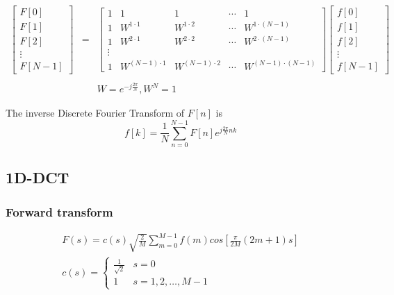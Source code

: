 \documentclass[journal,comsoc]{IEEEtran}
\begin{document}
\begin{figure*}[!ht]
\normalsize

\begin{eqnarray}
  \label{dft-mat}
  \begin{bmatrix}
    F[0]\\F[1]\\F[2]\\\vdots\\F[N-1]
  \end{bmatrix}&=&
  \begin{bmatrix}
    1&1&1&\cdots&1\\
    1&W^{1\cdot1}&W^{1\cdot2}&\cdots&W^{1\cdot(N-1)}\\
    1&W^{2\cdot1}&W^{2\cdot2}&\cdots&W^{2\cdot(N-1)}\\
    \vdots&\\
    1&W^{(N-1)\cdot1}&W^{(N-1)\cdot2}&\cdots&W^{(N-1)\cdot(N-1)}
  \end{bmatrix}
  \begin{bmatrix}
    f[0]\\f[1]\\f[2]\\\vdots\\f[N-1]
  \end{bmatrix}\\\nonumber\\
  &&W=e^{-j\frac{2\pi}{N}},W^{N}=1\nonumber
\end{eqnarray}

\hrulefill
\end{figure*}



The inverse Discrete Fourier Transform of $F[n]$ is
\begin{equation}
  \label{idft-equ}
  f[k]=\frac{1}{N}\sum_{n=0}^{N-1}F[n]e^{j\frac{2\pi}{N}nk}
\end{equation}

\subsection{1D-DCT}
\label{subsec:subsec-1d-dct}

\subsubsection{Forward transform}
\label{subsubsec:1d-dct-forward-transform}

\begin{eqnarray}
  \label{equ:1d-dct}
  F(s)=c(s)\sqrt{\frac{2}{M}}\sum_{m=0}^{M-1}f(m)cos[\frac{\pi}{2M}(2m+1)s]\\
  c(s)=
  \begin{cases}
    \frac{1}{\sqrt{2}}&s=0\\
    1&s=1,2,\ldots,M-1
  \end{cases}\nonumber
\end{eqnarray}
\end{document}
